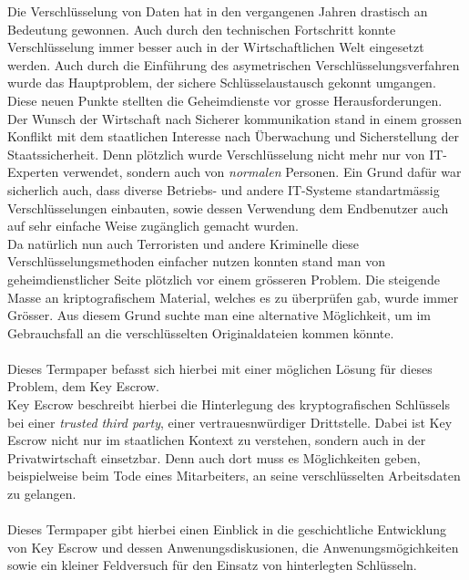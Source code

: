 Die Verschlüsselung von Daten hat in den vergangenen Jahren drastisch an Bedeutung gewonnen. Auch durch den technischen Fortschritt konnte Verschlüsselung immer besser auch in der Wirtschaftlichen Welt eingesetzt werden. Auch durch die Einführung des asymetrischen Verschlüsselungsverfahren wurde das Hauptproblem, der sichere Schlüsselaustausch gekonnt umgangen. \\
Diese neuen Punkte stellten die Geheimdienste vor grosse Herausforderungen. Der Wunsch der Wirtschaft nach Sicherer kommunikation stand in einem grossen Konflikt mit dem staatlichen Interesse nach Überwachung und Sicherstellung der Staatssicherheit. Denn plötzlich wurde Verschlüsselung nicht mehr nur von IT-Experten verwendet, sondern auch von \textit{normalen} Personen. Ein Grund dafür war sicherlich auch, dass diverse Betriebs- und andere IT-Systeme standartmässig Verschlüsselungen einbauten, sowie dessen Verwendung dem Endbenutzer auch auf sehr einfache Weise zugänglich gemacht wurden. \\
Da natürlich nun auch Terroristen und andere Kriminelle diese Verschlüsselungsmethoden einfacher nutzen konnten stand man von geheimdienstlicher Seite plötzlich vor einem grösseren Problem. Die steigende Masse an kriptografischem Material, welches es zu überprüfen gab, wurde immer Grösser. Aus diesem Grund suchte man eine alternative Möglichkeit, um im Gebrauchsfall an die verschlüsselten Originaldateien kommen könnte. \\
\\
Dieses Termpaper befasst sich hierbei mit einer möglichen Lösung für dieses Problem, dem Key Escrow.\\
Key Escrow beschreibt hierbei die Hinterlegung des kryptografischen Schlüssels bei einer \textit{trusted third party}, einer vertrauesnwürdiger Drittstelle. Dabei ist Key Escrow nicht nur im staatlichen Kontext zu verstehen, sondern auch in der Privatwirtschaft einsetzbar. Denn auch dort muss es Möglichkeiten geben, beispielweise beim Tode eines Mitarbeiters, an seine verschlüsselten Arbeitsdaten zu gelangen. \\
\\
Dieses Termpaper gibt hierbei einen Einblick in die geschichtliche Entwicklung von Key Escrow und dessen Anwenungsdiskusionen, die Anwenungsmögichkeiten sowie ein kleiner Feldversuch für den Einsatz von hinterlegten Schlüsseln.

